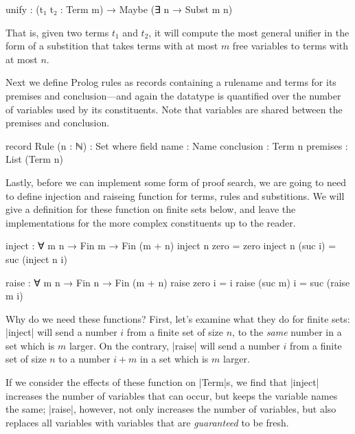 \documentclass[preprint]{sigplanconf}
\begin{document}
\begin{spec}
  unify : (t₁ t₂ : Term m) → Maybe (∃ n → Subst m n)
\end{spec}

That is, given two terms $t_1$ and $t_2$, it will compute the most general
unifier in the form of a substition that takes terms with at most $m$ free
variables to terms with at most $n$.


Next we define Prolog rules as records containing a rulename and terms for its
premises and conclusion---and again the datatype is quantified over the number of
variables used by its constituents. Note that variables are shared between the
premises and conclusion. 

\begin{code}
  record Rule (n : ℕ) : Set where
    field
      name        : Name
      conclusion  : Term n
      premises    : List (Term n)
\end{code}


Lastly, before we can implement some form of proof search, we are going to need
to define injection and raiseing function for terms, rules and substitions.
We will give a definition for these function on finite sets below, and leave the
implementations for the more complex constituents up to the reader.

\begin{code}
  inject : ∀ {m} n → Fin m → Fin (m + n)
  inject n  zero    = zero
  inject n (suc i)  = suc (inject n i)

  raise : ∀ m {n} → Fin n → Fin (m + n)
  raise  zero   i  = i
  raise (suc m) i  = suc (raise m i)
\end{code}

Why do we need these functions? First, let's examine what they do for finite sets:
|inject| will send a number $i$ from a finite set of size $n$, to the \emph{same}
number in a set which is $m$ larger.
On the contrary, |raise| will send a number $i$ from a finite set of size $n$ to a
number $i + m$ in a set which is $m$ larger.

If we consider the effects of these function on |Term|s, we find that |inject|
increases the number of variables that can occur, but keeps the variable names
the same; |raise|, however, not only increases the number of variables, but also
replaces all variables with variables that are \emph{guaranteed} to be fresh.
\end{document}
